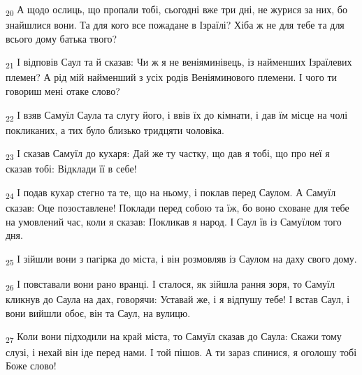 \begin{tcolorbox}
\textsubscript{20} А щодо ослиць, що пропали тобі, сьогодні вже три дні, не журися за них, бо знайшлися вони. Та для кого все пожадане в Ізраїлі? Хіба ж не для тебе та для всього дому батька твого?
\end{tcolorbox}
\begin{tcolorbox}
\textsubscript{21} І відповів Саул та й сказав: Чи ж я не веніяминівець, із найменших Ізраїлевих племен? А рід мій найменший з усіх родів Веніяминового племени. І чого ти говориш мені отаке слово?
\end{tcolorbox}
\begin{tcolorbox}
\textsubscript{22} І взяв Самуїл Саула та слугу його, і ввів їх до кімнати, і дав їм місце на чолі покликаних, а тих було близько тридцяти чоловіка.
\end{tcolorbox}
\begin{tcolorbox}
\textsubscript{23} І сказав Самуїл до кухаря: Дай же ту частку, що дав я тобі, що про неї я сказав тобі: Відклади її в себе!
\end{tcolorbox}
\begin{tcolorbox}
\textsubscript{24} І подав кухар стегно та те, що на ньому, і поклав перед Саулом. А Самуїл сказав: Оце позоставлене! Поклади перед собою та їж, бо воно сховане для тебе на умовлений час, коли я сказав: Покликав я народ. І Саул їв із Самуїлом того дня.
\end{tcolorbox}
\begin{tcolorbox}
\textsubscript{25} І зійшли вони з пагірка до міста, і він розмовляв із Саулом на даху свого дому.
\end{tcolorbox}
\begin{tcolorbox}
\textsubscript{26} І повставали вони рано вранці. І сталося, як зійшла рання зоря, то Самуїл кликнув до Саула на дах, говорячи: Уставай же, і я відпушу тебе! І встав Саул, і вони вийшли обоє, він та Саул, на вулицю.
\end{tcolorbox}
\begin{tcolorbox}
\textsubscript{27} Коли вони підходили на край міста, то Самуїл сказав до Саула: Скажи тому слузі, і нехай він іде перед нами. І той пішов. А ти зараз спинися, я оголошу тобі Боже слово!
\end{tcolorbox}
